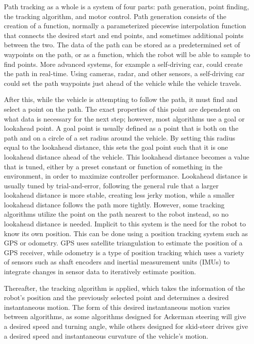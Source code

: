 \documentclass[mla7]{mla}
\begin{document}
\begin{paper}
Path tracking as a whole is a system of four parts: path generation, point finding, the tracking algorithm, and motor control. Path generation consists of the creation of a function, normally a parameterized piecewise interpolation function that connects the desired start and end points, and sometimes additional points between the two. The data of the path can be stored as a predetermined set of waypoints on the path, or as a function, which the robot will be able to sample to find points. More advanced systems, for example a self-driving car, could create the path in real-time. Using cameras, radar, and other sensors, a self-driving car could set the path waypoints just ahead of the vehicle while the vehicle travels.

After this, while the vehicle is attempting to follow the path, it must find and select a point on the path. The exact properties of this point are dependent on what data is necessary for the next step; however, most algorithms use a goal or lookahead point. A goal point is usually defined as a point that is both on the path and on a circle of a set radius around the vehicle. By setting this radius equal to the lookahead distance, this sets the goal point such that it is one lookahead distance ahead of the vehicle. This lookahead distance becomes a value that is tuned, either by a preset constant or function of something in the environment, in order to maximize controller performance. Lookahead distance is usually tuned by trial-and-error, following the general rule that a larger lookahead distance is more stable, creating less jerky motion, while a smaller lookahead distance follows the path more tightly. However, some tracking algorithms utilize the point on the path nearest to the robot instead, so no lookahead distance is needed. Implicit to this system is the need for the robot to know its own position. This can be done using a position tracking system such as GPS or odometry. GPS uses satellite triangulation to estimate the position of a GPS receiver, while odometry is a type of position tracking which uses a variety of sensors such as shaft encoders and inertial measurement units (IMUs) to integrate changes in sensor data to iteratively estimate position.

Thereafter, the tracking algorithm is applied, which takes the information of the robot's position and the previously selected point and determines a desired instantaneous motion. The form of this desired instantaneous motion varies between algorithms, as some algorithms designed for Ackerman steering will give a desired speed and turning angle, while others designed for skid-steer drives give a desired speed and instantaneous curvature of the vehicle's motion.


\end{paper}
\end{document}
